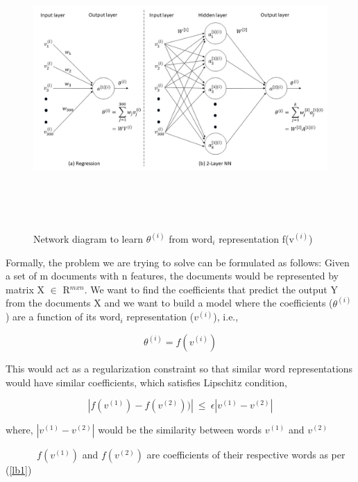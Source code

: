 \begin{figure}
\centering
\includegraphics[width=18cm, height=10cm]{fig1.jpg}\\
\centering
\caption{Network diagram to learn $\theta^{(i)}$ from word$_{i}$ representation f(v$^{(i)}$)}
\label{fig:foo}
\end{figure}

Formally, the problem we are trying to solve can be formulated as follows: Given a set of m documents with n features, the documents would be represented by matrix X $\in$ R$^{m x n}$. We want to find the coefficients that predict the output Y from the documents X and we want to build a model where the coefficients ($\theta^{(i)}$) are a function of its word$_{i}$ representation ($v^{(i)}$), i.e.,

\begin{equation}\label{lb1}
\theta^{(i)} = f(v^{(i)})
\end{equation}

This would act as a regularization constraint so that similar word representations would have similar coefficients, which satisfies Lipschitz condition,

\begin{equation}
|f(v^{(1)}) - f(v^{(2)}))|\ \leq\ \epsilon|v^{(1)}-v^{(2)}|
\end{equation}

where, $|v^{(1)}-v^{(2)}|$ would be the similarity between words $v^{(1)}$ and $v^{(2)}$

$\quad\qquad\ f(v^{(1)})$ and $f(v^{(2)})$ are coefficients of their respective words as per (\ref{lb1})

